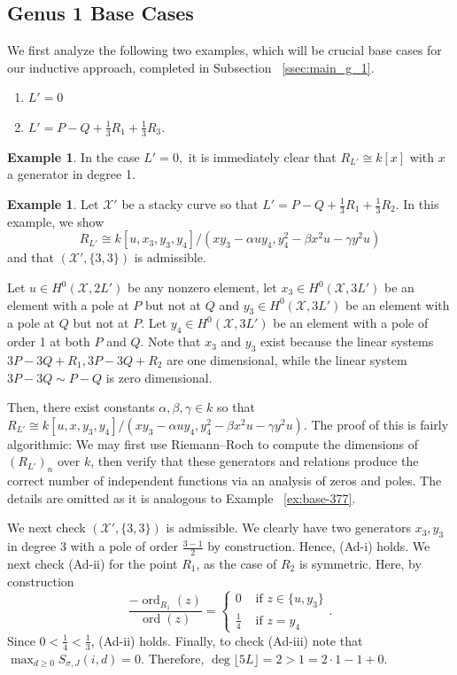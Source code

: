 \documentclass{amsart}
\theoremstyle{plain}
\theoremstyle{definition}
\newtheorem{example}[thm]{Example}
\theoremstyle{remark}
\numberwithin{equation}{section}
\newcommand\ssec{\subsection}
\newcommand \sx{\mathscr X}
\DeclareMathOperator{\ord}{ord}
\newcommand \halfcan{L}
\begin{document}
\ssec{Genus 1 Base Cases}
\label{ssec:g_1_base}

We first analyze the following two examples, which will be crucial base cases for our inductive approach, completed in Subsection ~\ref{ssec:main_g_1}.

\begin{enumerate}
	\item $\halfcan' = 0$
	\item $\halfcan' = P - Q + \frac{1}{3}R_1 + \frac{1}{3}R_3.$
\end{enumerate}

\begin{example}
\label{eg:base-1-0}
In the case $\halfcan' = 0,$ it is immediately clear that $R_{\halfcan'} \cong k[x]$ with $x$ a generator in degree 1.
\end{example}

\begin{example}
\label{eg:base-1-33}
Let $\sx'$ be a stacky curve so that $\halfcan' = P - Q + \frac{1}{3}R_1 + \frac{1}{3}R_2$. In this example, we show
$$R_{\halfcan'} \cong k[u,x_3,y_3,y_4]/(xy_3- \alpha uy_4,y_4^2 - \beta x^2 u - \gamma y^2u)$$
and that $(\sx',\{3,3\})$ is admissible.

Let $u \in H^0(\sx,2\halfcan')$ be any nonzero element, let $x_3 \in H^0(\sx,3\halfcan')$ be an element with a pole at $P$ but not at $Q$ and $y_3 \in H^0(\sx,3\halfcan')$ be an element with a pole at $Q$ but not at $P$. Let $y_4 \in H^0(\sx,3\halfcan')$ be an element with a pole of order 1 at both $P$ and $Q$. Note that $x_3$ and $y_3$ exist because the linear systems $3P - 3Q + R_1, 3P - 3Q + R_2$ are one dimensional, while the linear system $3P - 3Q \sim P-Q$ is zero dimensional.

Then, there exist constants $\alpha,\beta,\gamma \in k$ so that 
$R_{\halfcan'} \cong k[u,x,y_3,y_4]/(xy_3- \alpha uy_4,y_4^2 - \beta x^2 u - \gamma y^2u).$ The proof of this is fairly algorithmic: We may first use Riemann--Roch to compute the dimensions of $(R_{\halfcan'})_n$ over $k$, then verify that these generators and relations produce the correct number of independent functions via an analysis of zeros and poles. The details are omitted as it is analogous to Example ~\ref{ex:base-377}.

We next check $(\sx',\{3,3\})$ is admissible. We clearly have two generators $x_3,y_3$ in degree 3 with a pole of order $\frac{3-1}{2}$ by construction. Hence, (Ad-i) holds. We next check (Ad-ii) for the point $R_1$, as the case of $R_2$ is symmetric. Here, by construction
$$
\frac{-\ord_{R_1}(z)}{\ord(z)} = \begin{cases}
	0 &\text{ if }z \in \{u,y_3\}\\
	\frac{1}{4} &\text{ if }z = y_4
\end{cases}.$$
Since $0 < \frac{1}{4} < \frac{1}{3}$, (Ad-ii) holds.
Finally, to check (Ad-iii) note that $\max_{d \geq 0}S_{\sigma,J}(i,d) = 0.$ Therefore, $\deg \lfloor 5L \rfloor  = 2 > 1 = 2 \cdot 1 -1 + 0$.
\end{example}
\end{document}
